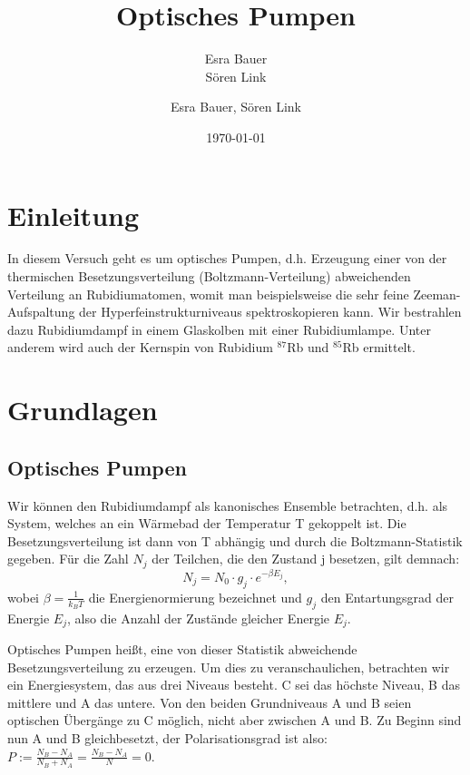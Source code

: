 \documentclass[bigchapter,colorback,accentcolor=tud4b,linedtoc,11pt]{tudreport}
\title{Optisches Pumpen}
\subtitle{Esra Bauer  \\Sören Link}
\author{Esra Bauer, Sören Link}
\date{\today}
\begin{document}

\maketitle

\tableofcontents

\chapter{Einleitung}

In diesem Versuch geht es um optisches Pumpen, d.h. Erzeugung einer von der thermischen Besetzungsverteilung (Boltzmann-Verteilung) abweichenden Verteilung an Rubidiumatomen, womit man beispielsweise die sehr feine Zeeman-Aufspaltung der Hyperfeinstrukturniveaus spektroskopieren kann. Wir bestrahlen dazu Rubidiumdampf in einem Glaskolben mit einer Rubidiumlampe. Unter anderem wird auch der Kernspin von Rubidium $^{87}$Rb und $^{85}$Rb ermittelt.

\chapter{Grundlagen}

\section{Optisches Pumpen}

Wir können den Rubidiumdampf als kanonisches Ensemble betrachten, d.h. als System, welches an ein Wärmebad der Temperatur T gekoppelt ist. Die Besetzungsverteilung ist dann von T abhängig und durch die Boltzmann-Statistik gegeben. Für die Zahl $N_j$ der Teilchen, die den Zustand j besetzen, gilt demnach:
$$N_j = N_0 \cdot g_j \cdot e^{- \beta E_j},$$
wobei $\beta = \frac{1}{k_B T}$ die Energienormierung bezeichnet und $g_j$ den Entartungsgrad der Energie $E_j$, also die Anzahl der Zustände gleicher Energie $E_j$.

Optisches Pumpen heißt, eine von dieser Statistik abweichende Besetzungsverteilung zu erzeugen. Um dies zu veranschaulichen, betrachten wir ein Energiesystem, das aus drei Niveaus besteht. C sei das höchste Niveau, B das mittlere und A das untere. Von den beiden Grundniveaus A und B seien optischen Übergänge zu C möglich, nicht aber zwischen A und B. Zu Beginn sind nun A und B gleichbesetzt, der Polarisationsgrad ist also: $P := \frac{N_B-N_A}{N_B+N_A} = \frac{N_B-N_A}{N} = 0$.
\end{document}
